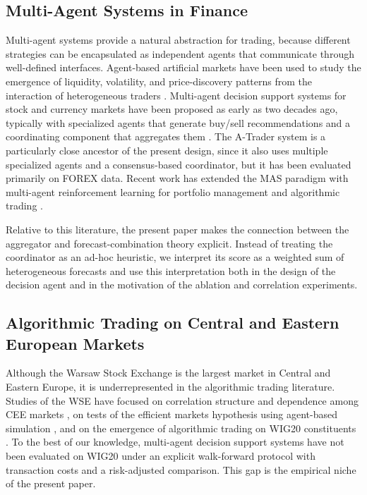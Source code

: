 \documentclass{ieeeaccess}
\begin{document}
\subsection{Multi-Agent Systems in Finance}

Multi-agent systems provide a natural abstraction for trading, because different strategies can be encapsulated as independent agents that communicate through well-defined interfaces. Agent-based artificial markets have been used to study the emergence of liquidity, volatility, and price-discovery patterns from the interaction of heterogeneous traders \cite{lebaron2011,8675280}. Multi-agent decision support systems for stock and currency markets have been proposed as early as two decades ago, typically with specialized agents that generate buy/sell recommendations and a coordinating component that aggregates them \cite{luo2002,korczak2013,hernes2016,hernes2024}. The A-Trader system \cite{korczak2013,hernes2016} is a particularly close ancestor of the present design, since it also uses multiple specialized agents and a consensus-based coordinator, but it has been evaluated primarily on FOREX data. Recent work has extended the MAS paradigm with multi-agent reinforcement learning for portfolio management \cite{huang2022} and algorithmic trading \cite{shavandi2022}.

Relative to this literature, the present paper makes the connection between the aggregator and forecast-combination theory \cite{batesgranger1969,clemen1989,timmermann2006} explicit. Instead of treating the coordinator as an ad-hoc heuristic, we interpret its score as a weighted sum of heterogeneous forecasts and use this interpretation both in the design of the decision agent and in the motivation of the ablation and correlation experiments.

\subsection{Algorithmic Trading on Central and Eastern European Markets}

Although the Warsaw Stock Exchange is the largest market in Central and Eastern Europe, it is underrepresented in the algorithmic trading literature. Studies of the WSE have focused on correlation structure and dependence among CEE markets \cite{czapkiewicz2015}, on tests of the efficient markets hypothesis using agent-based simulation \cite{jagric2015}, and on the emergence of algorithmic trading on WIG20 constituents \cite{buczynski2021}. To the best of our knowledge, multi-agent decision support systems have not been evaluated on WIG20 under an explicit walk-forward protocol with transaction costs and a risk-adjusted comparison. This gap is the empirical niche of the present paper.
\end{document}
